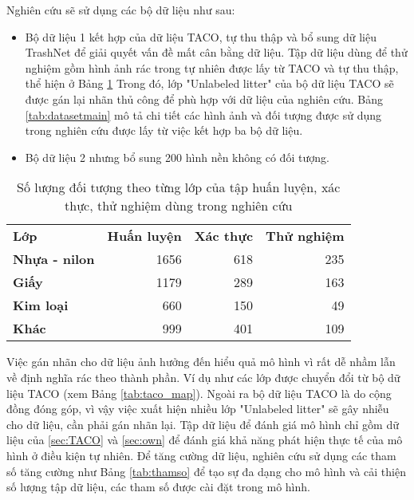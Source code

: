 \documentclass[../the.tex]{subfiles}
\begin{document}
{\fontsize{13}{12} \selectfont

Nghiên cứu sẽ sử dụng các bộ dữ liệu như sau:

\begin{itemize}
	\item Bộ dữ liệu 1 kết hợp của dữ liệu TACO, tự thu thập và bổ sung dữ liệu TrashNet để giải quyết vấn đề mất cân bằng dữ liệu. Tập dữ liệu dùng để thử nghiệm gồm hình ảnh rác trong tự nhiên được lấy từ TACO và tự thu thập, thể hiện ở Bảng \ref{tab:datasettest}
	      Trong đó, lớp "Unlabeled litter" của bộ dữ liệu TACO sẽ được gán lại nhãn thủ công để phù hợp với dữ liệu của nghiên cứu. Bảng \ref{tab:datasetmain} mô tả chi tiết các hình ảnh và đối tượng được sử dụng trong nghiên cứu được lấy từ việc kết hợp ba bộ dữ liệu.\label{item:dataset}
	\item Bộ dữ liệu 2 nhưng bổ sung 200 hình nền không có đối tượng.
\end{itemize}

}

\begin{table}[!ht]
	\centering
	\caption{Số lượng đối tượng theo từng lớp của tập huấn luyện, xác thực, thử nghiệm dùng trong nghiên cứu}
	\begin{tabular}{|l|r|r|r|}
		\cline{1-4}
		\textbf{Lớp}          & \textbf{Huấn luyện} & \textbf{Xác thực} & \textbf{Thử nghiệm}\\ \cline{1-4}
		\textbf{Nhựa - nilon} & 1656 & 618 & 235                \\ \cline{1-4}
		\textbf{Giấy}         & 1179 & 289 & 163                \\ \cline{1-4}
		\textbf{Kim loại}     & 660 & 150 & 49               \\ \cline{1-4}
		\textbf{Khác}         & 999 & 401 & 109               \\ \cline{1-4}
	\end{tabular}

	\label{tab:datasettest}
\end{table}

{\fontsize{13}{12} \selectfont

Việc gán nhãn cho dữ liệu ảnh hưởng đến hiểu quả mô hình vì rất dễ nhầm lẫn về định nghĩa rác theo thành phần. Ví dụ như các lớp được chuyển đổi từ bộ dữ liệu TACO (xem Bảng \ref{tab:taco_map}).
Ngoài ra bộ dữ liệu TACO là do cộng đồng đóng góp, vì vậy việc xuất hiện nhiều lớp "Unlabeled litter" sẽ gây nhiễu cho dữ liệu, cần phải gán nhãn lại.
Tập dữ liệu để đánh giá mô hình chỉ gồm dữ liệu của \ref{sec:TACO} và \ref{sec:own} để đánh giá khả năng phát hiện thực tế của mô hình ở điều kiện tự nhiên.
Để tăng cường dữ liệu, nghiên cứu sử dụng các tham số tăng cường như Bảng \ref{tab:thamso} để tạo sự đa dạng cho mô hình và cải thiện số lượng tập dữ liệu, các tham số được cài đặt trong mô hình.
}
\end{document}
